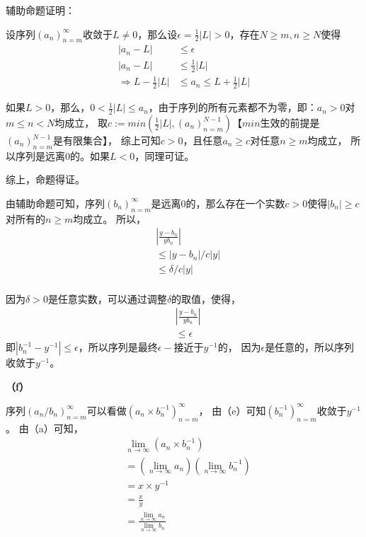\documentclass{article}
\theoremstyle{mystyle}
\begin{document}
\begin{zgraytheorem}
  辅助命题证明：

  设序列$(a_n)_{n=m}^\infty$收敛于$L \neq 0$，那么设$\epsilon = \frac{1}{2}|L| > 0$，存在$N \geq m, n \geq N$使得
  \begin{align*}
    |a_n - L|                      & \leq \epsilon                    \\
    |a_n - L|                      & \leq \frac{1}{2}|L|              \\
    \Rightarrow L - \frac{1}{2}|L| & \leq a_n \leq L + \frac{1}{2}|L|
  \end{align*}

  如果$L > 0$，那么，$0 < \frac{1}{2}|L| \leq a_n$，由于序列的所有元素都不为零，即：$a_n > 0$对$m \leq n < N$均成立，
  取$c := min(\frac{1}{2}|L|, (a_n)_{n=m}^{N-1})$【$min$生效的前提是$(a_n)_{n=m}^{N-1}$是有限集合】，
  综上可知$c > 0$，且任意$a_n \geq c$对任意$n \geq m$均成立，
  所以序列是远离$0$的。如果$L < 0$，同理可证。

  综上，命题得证。
\end{zgraytheorem}

由辅助命题可知，序列$(b_n)_{n=m}^\infty$是远离$0$的，那么存在一个实数$c > 0$使得$|b_n| \geq c$对所有的$n \geq m$均成立。
所以，
\begin{align*}
   & \left| \frac{y - b_n}{yb_n} \right| \\
   & \leq |y - b_n| / c|y|               \\
   & \leq \delta/c|y|                    \\
\end{align*}

因为$\delta>0$是任意实数，可以通过调整$\delta$的取值，使得，
\begin{align*}
   & \left| \frac{y - b_n}{yb_n} \right| \\
   & \leq \epsilon
\end{align*}
即$|b_n^{-1} - y^{-1}| \leq \epsilon$，所以序列是最终$\epsilon -$接近于$y^{-1}$的，
因为$\epsilon$是任意的，所以序列收敛于$y^{-1}$。

\textbf{（f）}

序列$(a_n/b_n)_{n=m}^\infty$可以看做$(a_n \times b_n^{-1})_{n=m}^\infty$，
由（e）可知$(b_n^{-1})_{n=m}^\infty$收敛于$y^{-1}$。
由（a）可知，
\begin{align*}
   & \lim\limits_{n \rightarrow \infty}(a_n \times b_n^{-1})                               \\
   & = (\lim\limits_{n \rightarrow \infty}a_n)(\lim\limits_{n \rightarrow \infty}b_n^{-1}) \\
   & = x \times y^{-1}                                                                     \\
   & = \frac{x}{y}                                                                         \\
   & = \frac{\lim\limits_{n \rightarrow \infty}a_n}{\lim\limits_{n \rightarrow \infty}b_n}
\end{align*}
\end{document}

